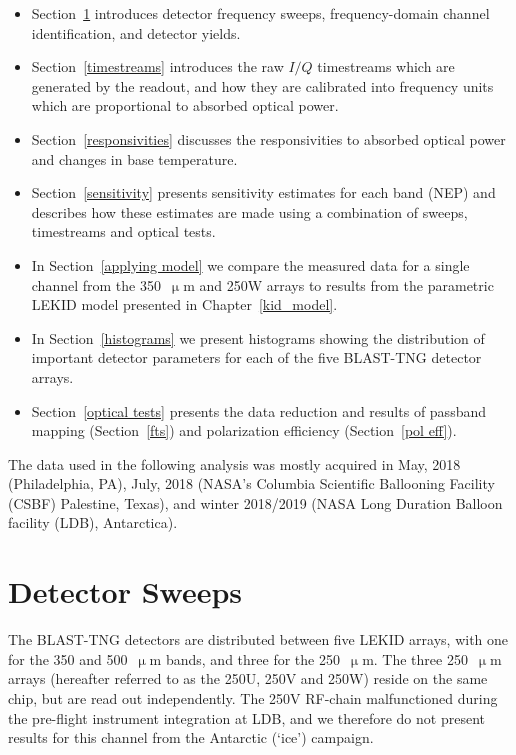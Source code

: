 \begin{itemize}[nosep]
  \item Section~\ref{sweeps} introduces detector frequency sweeps, frequency-domain channel identification, and detector yields.
  \item Section~\ref{timestreams} introduces the raw $I/Q$ timestreams which are generated by the readout, and how they are calibrated into frequency units which are proportional to absorbed optical power.
  \item Section~\ref{responsivities} discusses the responsivities to absorbed optical power and changes in base temperature.
  \item Section~\ref{sensitivity} presents sensitivity estimates for each band (NEP) and describes how these estimates are made using a combination of sweeps, timestreams and optical tests.
  \item In Section~\ref{applying model} we compare the measured data for a single channel from the 350~$\upmu$m and 250W arrays to results from the parametric LEKID model presented in Chapter~\ref{kid_model}.
  \item In Section~\ref{histograms} we present histograms showing the distribution of important detector parameters for each of the five BLAST-TNG detector arrays.
  \item Section~\ref{optical tests} presents the data reduction and results of passband mapping (Section~\ref{fts}) and polarization efficiency (Section~\ref{pol eff}).
\end{itemize}

The data used in the following analysis was mostly acquired in May, 2018 (Philadelphia, PA), July, 2018 (NASA's Columbia Scientific Ballooning Facility (CSBF) Palestine, Texas), and winter 2018/2019 (NASA Long Duration Balloon facility (LDB), Antarctica).

\section{Detector Sweeps}\label{sweeps}

The BLAST-TNG detectors are distributed between five LEKID arrays, with one for the 350 and 500~$\upmu$m bands, and three for the 250~$\upmu$m. The three 250~$\upmu$m arrays (hereafter referred to as the 250U, 250V and 250W) reside on the same chip, but are read out independently. The 250V RF-chain malfunctioned during the pre-flight instrument integration at LDB, and we therefore do not present results for this channel from the Antarctic (`ice') campaign.

